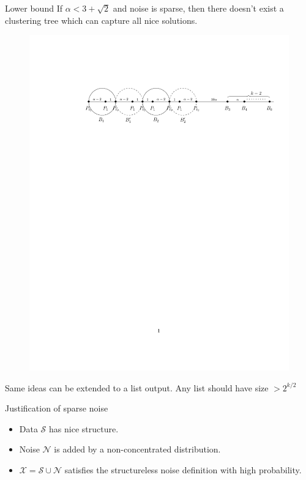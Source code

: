 \documentclass{beamer}
\newcommand{\mc}{\mathcal}
\begin{document}
\begin{frame}{Lower bound}
	If $\alpha < 3 + \sqrt{2}$ and noise is sparse, then there doesn't exist a clustering tree which can capture all nice solutions.
	\begin{figure}[!t]
	  \begin{center}
	    \includegraphics[trim={47mm 205mm 12mm 44mm},clip,width=\textwidth]{lbdFig2.pdf}
	  \end{center}
	\end{figure}
	Same ideas can be extended to a list output. Any list should have size $> 2^{k/2}$
\end{frame}

\begin{frame}{Justification of sparse noise}
    \begin{itemize}
	  \item Data $\mc S$ has nice structure.
	  \item Noise $\mc N$ is added by a non-concentrated distribution.
	  \pause
	  \item $\mc X = \mc S \cup \mc N$ satisfies the structureless noise definition with high probability.
    \end{itemize}
\end{frame}
\end{document}
